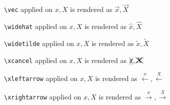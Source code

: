 \texttt{\textbackslash vec} applied on $x,X$ is rendered as $\vec{x},\vec{X}$


\texttt{\textbackslash widehat} applied on $x,X$ is rendered as $\widehat{x},\widehat{X}$


\texttt{\textbackslash widetilde} applied on $x,X$ is rendered as $\widetilde{x},\widetilde{X}$


\texttt{\textbackslash xcancel} applied on $x,X$ is rendered as $\xcancel{x},\xcancel{X}$


\texttt{\textbackslash xleftarrow} applied on $x,X$ is rendered as $\xleftarrow{x},\xleftarrow{X}$


\texttt{\textbackslash xrightarrow} applied on $x,X$ is rendered as $\xrightarrow{x},\xrightarrow{X}$

